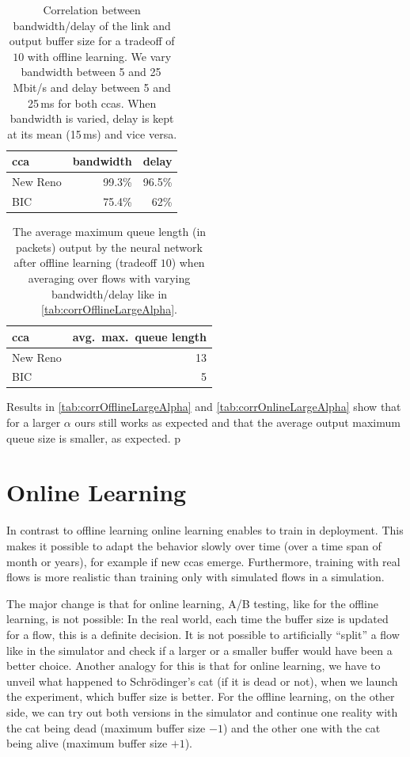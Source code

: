\documentclass[conference]{IEEEtran}
\begin{document}
\begin{table}[h]
\caption{Correlation between bandwidth/delay of the link and output buffer size for a tradeoff of $10$ with offline learning. We vary bandwidth between 5 and 25\,Mbit/s and delay between 5 and 25\,ms for both \glspl{cca}. When bandwidth is varied, delay is kept at its mean (15\,ms) and vice versa.} \label{tab:corrOfflineLargeAlpha}
\centering
\begin{tabular}{lrr} \toprule
\gls{cca} & bandwidth & delay \\ \midrule
New Reno & 99.3\% & 96.5\% \\
BIC & 75.4\% & 62\% \\
\bottomrule
\end{tabular}
\end{table}

\begin{table}[h]
\caption{The average maximum queue length (in packets) output by the neural network after offline learning (tradeoff $10$) when averaging over flows with varying bandwidth/delay like in \autoref{tab:corrOfflineLargeAlpha}.} \label{tab:avgOfflineLargeAlpha}
\centering
\begin{tabular}{lr} \toprule
\gls{cca} & avg.~max.~queue length \\ \midrule
New Reno & 13 \\
BIC & 5 \\
\bottomrule
\end{tabular}
\end{table}

Results in \autoref{tab:corrOfflineLargeAlpha} and \autoref{tab:corrOnlineLargeAlpha} show that for a larger $\alpha$ \gls{ours} still works as expected and that the average output maximum queue size is smaller, as expected. p

\section{Online Learning}

In contrast to offline learning online learning enables to train in deployment. This makes it possible to adapt the behavior slowly over time (over a time span of month or years), for example if new \glspl{cca} emerge. Furthermore, training with real flows is more realistic than training only with simulated flows in a simulation. 

The major change is that for online learning, A/B testing, like for the offline learning, is not possible: In the real world, each time the buffer size is updated for a flow, this is a definite decision. It is not possible to artificially ``split'' a flow like in the simulator and check if a larger or a smaller buffer would have been a better choice. Another analogy for this is that for online learning, we have to unveil what happened to Schrödinger's cat (if it is dead or not), when we launch the experiment, which buffer size is better. For the offline learning, on the other side, we can try out both versions in the simulator and continue one reality with the cat being dead (maximum buffer size $-1$) and the other one with the cat being alive (maximum buffer size $+1$). 
\end{document}
